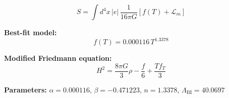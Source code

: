 
\begin{equation}
  S = \int d^4x \, |e| \, \frac{1}{16\pi G} \left[ f(T) + \mathcal{L}_m \right]
\end{equation}

\textbf{Best-fit model:}
\begin{equation}
  f(T) = 0.000116 \, T^{1.3378}
\end{equation}

\textbf{Modified Friedmann equation:}
\begin{equation}
  H^2 = \frac{8\pi G}{3} \rho - \frac{f}{6} + \frac{T f_T}{3}
\end{equation}

\textbf{Parameters:}
$\alpha = 0.000116$, \quad
$\beta = -0.471223$, \quad
$n = 1.3378$, \quad
$\Lambda_{\text{BI}} = 40.0697$